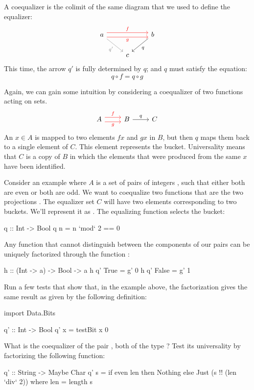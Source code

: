 \documentclass[DaoFP]{subfiles}
\begin{document}
A coequalizer is the colimit of the same diagram that we used to define the equalizer:
\[
\begin{tikzcd}
a 
\arrow[rr, red, shift left=.75ex, "f"]
\arrow[rr, red, shift right=.75ex, "g"']
\arrow[rd, gray, "q'"']
&&
b
\arrow[ld, "q"]
\\
& c
\end{tikzcd}
\]
This time, the arrow $q'$ is fully determined by $q$; and $q$ must satisfy the equation:
\[ q \circ f = q \circ g \]

Again, we can gain some intuition by considering a coequalizer of two functions acting on sets. 
\[
\begin{tikzcd}
A
\arrow[r, red, shift left=.75ex, "f"]
\arrow[r, red, shift right=.75ex, "g"']
&
B
\arrow[r, "q"]
& C
\end{tikzcd}
\]
An $x \in A$ is mapped to two elements $f x$ and $g x$ in $B$, but then $q$ maps them back to a single element of $C$. This element represents the bucket. Universality means that $C$ is a copy of $B$ in which the elements that were produced from the same $x$ have been identified.

Consider an example where $A$ is a set of pairs of integers , such that either both are even or both are odd.  We want to coequalize two functions that are the two projections . The equalizer set $C$ will have two elements corresponding to two buckets. We'll represent it as . The equalizing function  selects the bucket:
\begin{haskell}
q :: Int -> Bool
q n = n `mod` 2 == 0 
\end{haskell}
Any function  that cannot distinguish between the components of our pairs can be uniquely factorized through the function :
\begin{haskell}
h :: (Int -> a) -> Bool -> a
h q' True  = g' 0
h q' False = g' 1
\end{haskell}

\begin{exercise}
Run a few tests that show that, in the example above, the factorization  gives the same result as  given by the following definition:
\begin{haskell}
import Data.Bits

q' :: Int -> Bool
q' x = testBit x 0
\end{haskell}

\end{exercise}
\begin{exercise}
What is the coequalizer of the pair , both of the type ? Test its universality by factorizing the following function:
\begin{haskell}
q' :: String -> Maybe Char
q' s = if even len
       then Nothing
       else Just (s !! (len `div` 2))
  where len = length s
\end{haskell}
\end{exercise}
\end{document}
